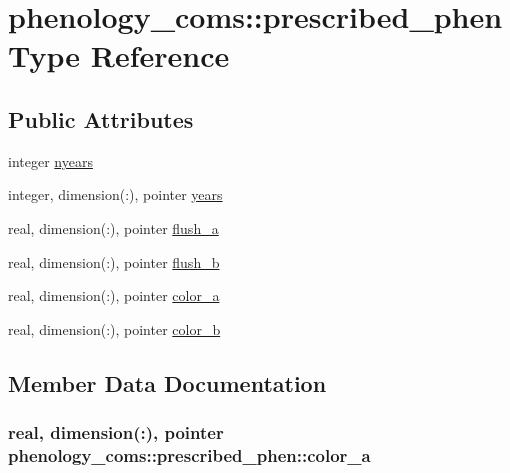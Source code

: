 \hypertarget{structphenology__coms_1_1prescribed__phen}{}\section{phenology\+\_\+coms\+:\+:prescribed\+\_\+phen Type Reference}
\label{structphenology__coms_1_1prescribed__phen}
\subsection*{Public Attributes}
\begin{DoxyCompactItemize}
\item 
integer \hyperlink{structphenology__coms_1_1prescribed__phen_ae504780a4760ecefc6851a141bbb426b}{nyears}
\item 
integer, dimension(\+:), pointer \hyperlink{structphenology__coms_1_1prescribed__phen_ae40ae2762a61f5e09ce4162444b253b0}{years}
\item 
real, dimension(\+:), pointer \hyperlink{structphenology__coms_1_1prescribed__phen_a04026ef978e9fb2e2a602d3fb25a1b81}{flush\+\_\+a}
\item 
real, dimension(\+:), pointer \hyperlink{structphenology__coms_1_1prescribed__phen_a75c4a5b801c5e6d00dd23e7c0de13113}{flush\+\_\+b}
\item 
real, dimension(\+:), pointer \hyperlink{structphenology__coms_1_1prescribed__phen_ad1c3cc319ade0cc196131f3c1e94e64e}{color\+\_\+a}
\item 
real, dimension(\+:), pointer \hyperlink{structphenology__coms_1_1prescribed__phen_a1e62e38b18938bd089d8ac27b3d3eec0}{color\+\_\+b}
\end{DoxyCompactItemize}


\subsection{Member Data Documentation}
\hypertarget{structphenology__coms_1_1prescribed__phen_ad1c3cc319ade0cc196131f3c1e94e64e}{}
\subsubsection[{color\+\_\+a}]{\setlength{\rightskip}{0pt plus 5cm}real, dimension(\+:), pointer phenology\+\_\+coms\+::prescribed\+\_\+phen\+::color\+\_\+a}\label{structphenology__coms_1_1prescribed__phen_ad1c3cc319ade0cc196131f3c1e94e64e}
\hypertarget{structphenology__coms_1_1prescribed__phen_a1e62e38b18938bd089d8ac27b3d3eec0}{}
